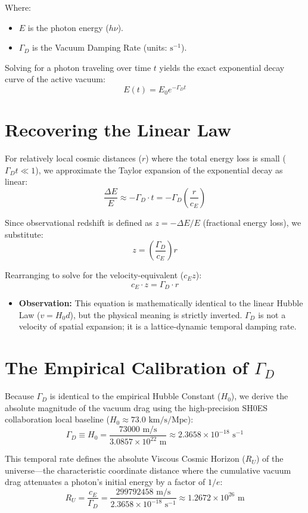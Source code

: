 Where:
\begin{itemize}
    \item $E$ is the photon energy ($h\nu$).
    \item $\Gamma_D$ is the Vacuum Damping Rate (units: $\text{s}^{-1}$).
\end{itemize}

Solving for a photon traveling over time $t$ yields the exact exponential decay curve of the active vacuum:
\[
E(t) = E_0 e^{-\Gamma_D t}
\]

\section{Recovering the Linear Law}
For relatively local cosmic distances ($r$) where the total energy loss is small ($\Gamma_D t \ll 1$), we approximate the Taylor expansion of the exponential decay as linear:
\[
\frac{\Delta E}{E} \approx -\Gamma_D \cdot t = -\Gamma_D \left(\frac{r}{c_E}\right)
\]

Since observational redshift is defined as $z = -\Delta E / E$ (fractional energy loss), we substitute:
\[
z = \left(\frac{\Gamma_D}{c_E}\right)r
\]

Rearranging to solve for the velocity-equivalent ($c_E z$):
\[
c_E \cdot z = \Gamma_D \cdot r
\]

\begin{itemize}
    \item \textbf{Observation:} This equation is mathematically identical to the linear Hubble Law ($v = H_0 d$), but the physical meaning is strictly inverted. $\Gamma_D$ is not a velocity of spatial expansion; it is a lattice-dynamic temporal damping rate.
\end{itemize}

\section{The Empirical Calibration of $\Gamma_D$}
Because $\Gamma_D$ is identical to the empirical Hubble Constant ($H_0$), we derive the absolute magnitude of the vacuum drag using the high-precision SH0ES collaboration local baseline ($H_0 \approx 73.0 \text{ km/s/Mpc}$):
\[
\Gamma_D \equiv H_0 = \frac{73000 \text{ m/s}}{3.0857 \times 10^{22} \text{ m}} \approx 2.3658 \times 10^{-18} \text{ s}^{-1}
\]

This temporal rate defines the absolute Viscous Cosmic Horizon ($R_U$) of the universe---the characteristic coordinate distance where the cumulative vacuum drag attenuates a photon's initial energy by a factor of $1/e$:
\[
R_U = \frac{c_E}{\Gamma_D} = \frac{299792458 \text{ m/s}}{2.3658 \times 10^{-18} \text{ s}^{-1}} \approx 1.2672 \times 10^{26} \text{ m}
\]

